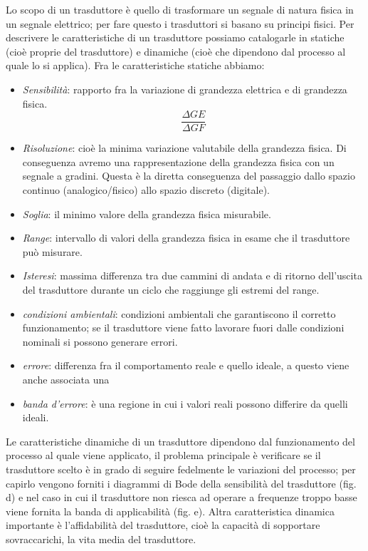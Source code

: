 Lo scopo di un trasduttore è quello di trasformare un segnale di
natura fisica in un segnale elettrico; per fare questo i trasduttori
si basano su principi fisici.
Per descrivere le caratteristiche di un trasduttore possiamo
catalogarle in statiche (cioè proprie del trasduttore) e dinamiche
(cioè che dipendono dal processo al quale lo si applica).
Fra le caratteristiche statiche abbiamo:
\begin{itemize}
 \item \textit{Sensibilità}: rapporto fra la variazione di grandezza
elettrica e di grandezza fisica.
	\[ \frac{\Delta GE}{\Delta GF} \]
 \item \textit{Risoluzione}: cioè la minima variazione valutabile
della grandezza fisica. Di conseguenza avremo una rappresentazione
della grandezza fisica con un segnale a gradini. Questa è la diretta
conseguenza del passaggio dallo spazio continuo (analogico/fisico)
allo spazio discreto (digitale).
 \item \textit{Soglia}: il minimo valore della grandezza fisica
misurabile.
 \item \textit{Range}: intervallo di valori della grandezza fisica in
esame che il trasduttore può misurare.
 \item \textit{Isteresi}: massima differenza tra due cammini di
andata e di ritorno dell'uscita del trasduttore durante un ciclo che
raggiunge gli estremi del range.
 \item \textit{condizioni ambientali}: condizioni ambientali che
garantiscono il corretto funzionamento; se il trasduttore viene fatto
lavorare fuori dalle condizioni nominali si possono generare errori.
 \item \textit{errore}: differenza fra il comportamento reale e
quello ideale, a questo viene anche associata una
 \item \textit{banda d'errore}: è una regione in cui i valori reali
possono differire da quelli ideali.
\end{itemize}

Le caratteristiche dinamiche di un trasduttore dipendono dal
funzionamento del processo al quale viene applicato, il problema
principale è verificare se il trasduttore scelto è in grado di seguire
fedelmente le variazioni del processo; per capirlo vengono forniti i
diagrammi di Bode della sensibilità del trasduttore (fig. d) e nel
caso in cui il trasduttore non riesca ad operare a frequenze troppo
basse viene fornita la banda di applicabilità (fig. e). Altra
caratteristica dinamica importante è l'affidabilità del trasduttore,
cioè la capacità di sopportare sovraccarichi, la vita media del
trasduttore.